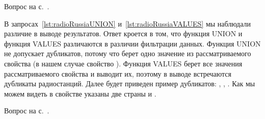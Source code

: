 \begin{task}
    \label{answer:radio_stations2}

    \AnswerBackref Вопрос на с.~\pageref{question:radio2}.

В запросах~\ref{lst:radioRussiaUNION} и~\ref{lst:radioRussiaVALUES} мы наблюдали различие в выводе результатов. Ответ кроется в том, что функция UNION и функция VALUES различаются в различии фильтрации данных. Функция UNION не допускает дубликатов, потому что берет одно значение из рассматриваемого свойства (в нашем случае свойство ). Функция VALUES берет все значения рассматриваемого свойства и выводит их, поэтому в выводе встречаются дубликаты радиостанций. Далее будет приведен пример дубликатов: , , . Как мы можем видеть в свойстве  указаны две страны  и .

\end{task}

\begin{task}
    \label{answer:radio_stations3}

    \AnswerBackref Вопрос на с.~\pageref{question:radio3}.

    \end{task}
